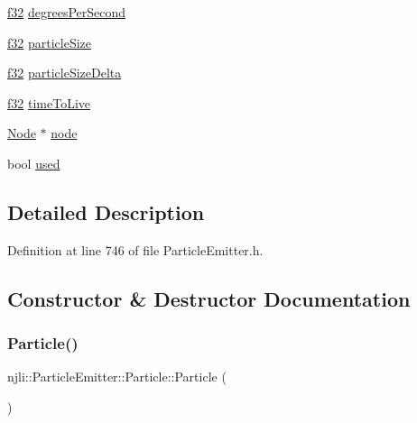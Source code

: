 \begin{DoxyCompactItemize}
\item 
\mbox{\hyperlink{_util_8h_a5f6906312a689f27d70e9d086649d3fd}{f32}} \mbox{\hyperlink{structnjli_1_1_particle_emitter_1_1_particle_adad3c449c06bc60ac72721d008274228}{degrees\+Per\+Second}}
\item 
\mbox{\hyperlink{_util_8h_a5f6906312a689f27d70e9d086649d3fd}{f32}} \mbox{\hyperlink{structnjli_1_1_particle_emitter_1_1_particle_a3acb5624501e87e35969f30d01b83073}{particle\+Size}}
\item 
\mbox{\hyperlink{_util_8h_a5f6906312a689f27d70e9d086649d3fd}{f32}} \mbox{\hyperlink{structnjli_1_1_particle_emitter_1_1_particle_a2220049218ea0743249374e7024d2205}{particle\+Size\+Delta}}
\item 
\mbox{\hyperlink{_util_8h_a5f6906312a689f27d70e9d086649d3fd}{f32}} \mbox{\hyperlink{structnjli_1_1_particle_emitter_1_1_particle_aa099f2fa9eaa5aa5f63e4b8110bd34f7}{time\+To\+Live}}
\item 
\mbox{\hyperlink{classnjli_1_1_node}{Node}} $\ast$ \mbox{\hyperlink{structnjli_1_1_particle_emitter_1_1_particle_a1d239187f6bfa8e36db1e387c79feb47}{node}}
\item 
bool \mbox{\hyperlink{structnjli_1_1_particle_emitter_1_1_particle_a223d0b5f5ad07c8dede4f7f354ddd9c2}{used}}
\end{DoxyCompactItemize}


\subsection{Detailed Description}


Definition at line 746 of file Particle\+Emitter.\+h.



\subsection{Constructor \& Destructor Documentation}
\mbox{\label{structnjli_1_1_particle_emitter_1_1_particle_a8c71e163c93619d9dcfdc4314147c3df}} 
\subsubsection{\texorpdfstring{Particle()}{Particle()}}
{\footnotesize\ttfamily njli\+::\+Particle\+Emitter\+::\+Particle\+::\+Particle (\begin{DoxyParamCaption}{ }\end{DoxyParamCaption})}

